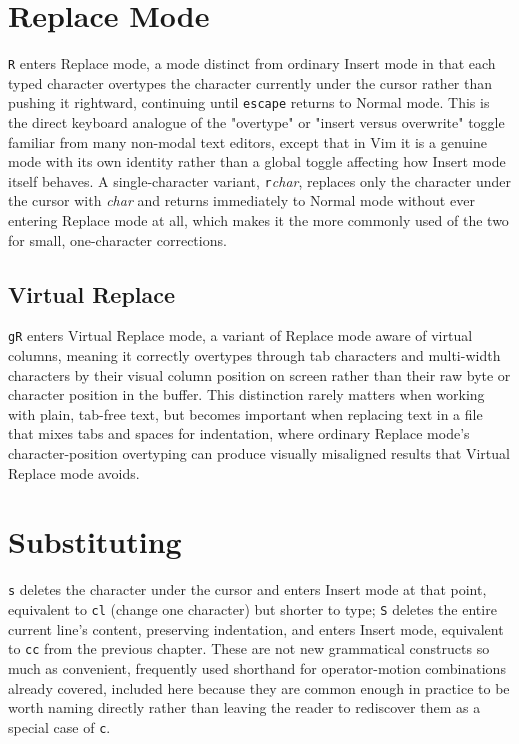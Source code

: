 \section{Replace Mode}

\texttt{R} enters Replace mode, a mode distinct from ordinary Insert mode in that each typed character overtypes the character currently under the cursor rather than pushing it rightward, continuing until \texttt{escape} returns to Normal mode. This is the direct keyboard analogue of the "overtype" or "insert versus overwrite" toggle familiar from many non-modal text editors, except that in Vim it is a genuine mode with its own identity rather than a global toggle affecting how Insert mode itself behaves. A single-character variant, \texttt{r}\textit{char}, replaces only the character under the cursor with \textit{char} and returns immediately to Normal mode without ever entering Replace mode at all, which makes it the more commonly used of the two for small, one-character corrections.

\subsection{Virtual Replace}

\texttt{gR} enters Virtual Replace mode, a variant of Replace mode aware of virtual columns, meaning it correctly overtypes through tab characters and multi-width characters by their visual column position on screen rather than their raw byte or character position in the buffer. This distinction rarely matters when working with plain, tab-free text, but becomes important when replacing text in a file that mixes tabs and spaces for indentation, where ordinary Replace mode's character-position overtyping can produce visually misaligned results that Virtual Replace mode avoids.

\section{Substituting}

\texttt{s} deletes the character under the cursor and enters Insert mode at that point, equivalent to \texttt{cl} (change one character) but shorter to type; \texttt{S} deletes the entire current line's content, preserving indentation, and enters Insert mode, equivalent to \texttt{cc} from the previous chapter. These are not new grammatical constructs so much as convenient, frequently used shorthand for operator-motion combinations already covered, included here because they are common enough in practice to be worth naming directly rather than leaving the reader to rediscover them as a special case of \texttt{c}.

